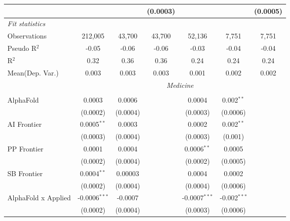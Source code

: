 \begin{tabular}{lcccccc}
                                  &                 &                 & (0.0003)        &                 &                & (0.0005)\\   
   \midrule
   \emph{Fit statistics}\\
   Observations                   & 212,005         & 43,700          & 43,700          & 52,136          & 7,751          & 7,751\\  
   Pseudo R$^2$                   & -0.05           & -0.06           & -0.06           & -0.03           & -0.04          & -0.04\\  
   R$^2$                          & 0.32            & 0.36            & 0.36            & 0.24            & 0.24           & 0.24\\  
   
Mean(Dep. Var.) & 0.003 & 0.003 & 0.003 & 0.001 & 0.002 & 0.002 \\
 & \multicolumn{6}{c}{\textit{Medicine}} \\ \\
   AlphaFold                      & 0.0003          & 0.0006         &                & 0.0004          & 0.002$^{**}$   &   \\   
                                  & (0.0002)        & (0.0004)       &                & (0.0003)        & (0.0006)       &   \\   
   AI Frontier                    & 0.0005$^{**}$   & 0.0003         &                & 0.0002          & 0.002$^{**}$   &   \\   
                                  & (0.0003)        & (0.0004)       &                & (0.0003)        & (0.001)        &   \\   
   PP Frontier                    & 0.0001          & 0.0004         &                & 0.0006$^{**}$   & 0.0005         &   \\   
                                  & (0.0002)        & (0.0004)       &                & (0.0002)        & (0.0005)       &   \\   
   SB Frontier                    & 0.0004$^{**}$   & 0.00003        &                & 0.0004          & 0.0002         &   \\   
                                  & (0.0002)        & (0.0004)       &                & (0.0004)        & (0.0006)       &   \\   
   AlphaFold x Applied            & -0.0006$^{***}$ & -0.0007        &                & -0.0007$^{***}$ & -0.002$^{***}$ &   \\   
                                  & (0.0002)        & (0.0004)       &                & (0.0003)        & (0.0006)       &   \\   

\end{tabular}
